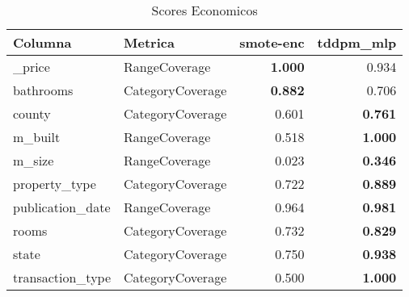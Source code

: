 \begin{table}[H]
\centering
\caption{Scores Economicos}
\label{table-coverage-economicos-a-3}
\begin{tabular}{|l|l|r|r|}
\hline
\rowcolor[gray]{0.8}
Columna & Metrica & smote-enc & tddpm\_mlp \\
\hline \_price & RangeCoverage & \bfseries 1.000 & 0.934 \\
\hline bathrooms & CategoryCoverage & \bfseries 0.882 & 0.706 \\
\hline county & CategoryCoverage & 0.601 & \bfseries 0.761 \\
\hline m\_built & RangeCoverage & 0.518 & \bfseries 1.000 \\
\hline m\_size & RangeCoverage & 0.023 & \bfseries 0.346 \\
\hline property\_type & CategoryCoverage & 0.722 & \bfseries 0.889 \\
\hline publication\_date & RangeCoverage & 0.964 & \bfseries 0.981 \\
\hline rooms & CategoryCoverage & 0.732 & \bfseries 0.829 \\
\hline state & CategoryCoverage & 0.750 & \bfseries 0.938 \\
\hline transaction\_type & CategoryCoverage & 0.500 & \bfseries 1.000 \\
\hline
\end{tabular}
\end{table}
